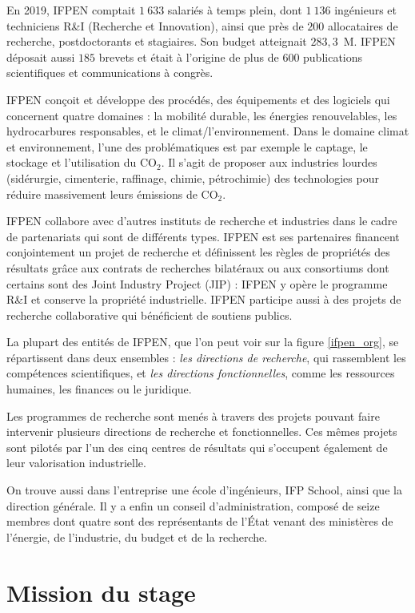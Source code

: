 \documentclass[12pt,a4paper]{report}
\begin{document}
En 2019, IFPEN comptait $1\ 633$ salariés à temps plein, dont $1\ 136$ ingénieurs et techniciens R\&I (Recherche et Innovation), ainsi que près de $200$ allocataires de recherche, postdoctorants et stagiaires. Son budget atteignait $283,3$~\textrm{M}\texteuro. IFPEN déposait aussi $185$ brevets et était à l'origine de plus de $600$ publications scientifiques et communications à congrès.

IFPEN conçoit et développe des procédés, des équipements et des logiciels qui concernent quatre domaines : la mobilité durable, les énergies renouvelables, les hydrocarbures responsables, et le climat/l'environnement. Dans le domaine climat et environnement, l'une des problématiques est par exemple le captage, le stockage et l'utilisation du CO$_2$. Il s'agit de proposer aux industries lourdes (sidérurgie, cimenterie, raffinage, chimie, pétrochimie) des technologies pour réduire massivement leurs émissions de CO$_2$.

IFPEN collabore avec d'autres instituts de recherche et industries dans le cadre de partenariats qui sont de différents types. IFPEN est ses partenaires financent conjointement un projet de recherche et définissent les règles de propriétés des résultats grâce aux contrats de recherches bilatéraux ou aux consortiums dont certains sont des Joint Industry Project (JIP) : IFPEN y opère le programme R\&I et conserve la propriété industrielle. IFPEN participe aussi à des projets de recherche collaborative qui bénéficient de soutiens publics.

La plupart des entités de IFPEN, que l'on peut voir sur la figure \ref{ifpen_org}, se répartissent dans deux ensembles : \emph{les directions de recherche}, qui rassemblent les compétences scientifiques, et \emph{les directions fonctionnelles}, comme les ressources humaines, les finances ou le juridique.

Les programmes de recherche sont menés à travers des projets pouvant faire intervenir plusieurs directions de recherche et fonctionnelles. Ces mêmes projets sont pilotés par l'un des cinq centres de résultats qui s'occupent également de leur valorisation industrielle.

On trouve aussi dans l'entreprise une école d'ingénieurs, IFP School, ainsi que la direction générale. Il y a enfin un conseil d'administration, composé de seize membres dont quatre sont des représentants de l'\'Etat venant des ministères de l'énergie, de l'industrie, du budget et de la recherche.

\newpage
\section{Mission du stage}
\end{document}
